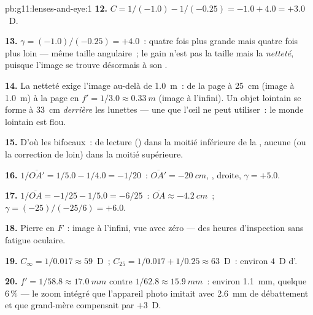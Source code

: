 \begin{solution}{pb:g11:lenses-and-eye:1}
\textbf{12.} $C = 1/(-1.0) - 1/(-0.25) = -1.0 + 4.0 = +3.0$~D.

\textbf{13.} $\gamma = (-1.0)/(-0.25) = +4.0$~: quatre fois plus grande
mais quatre fois plus loin --- même taille angulaire~; le gain n'est
pas la taille mais la \emph{netteté}, puisque l'image se trouve
désormais à son .

\textbf{14.} La netteté exige l'image au-delà de \qty{1.0}{m}~: de la
page à \qty{25}{cm} (image à \qty{1.0}{m}) à la page en
$f' = 1/3.0 \approx \qty{0.33}{m}$ (image à l'infini). Un objet
lointain se forme à \qty{33}{cm} \emph{derrière} les lunettes --- une
 que l'œil ne peut utiliser~: le monde
lointain est flou.

\textbf{15.} D'où les bifocaux~:  de lecture
() dans la moitié inférieure de la
, aucune (ou la correction de loin) dans la
moitié supérieure.

\textbf{16.} $1/\overline{OA'} = 1/5.0 - 1/4.0 = -1/20$~:
$\overline{OA'} = \qty{-20}{cm}$, ,
droite, $\gamma = +5.0$.

\textbf{17.} $1/\overline{OA} = -1/25 - 1/5.0 = -6/25$~:
$\overline{OA} \approx \qty{-4.2}{cm}$~; $\gamma = (-25)/(-25/6) = +6.0$.

\textbf{18.} Pierre en $F$~: image à l'infini, vue avec zéro
 --- des heures d'inspection sans fatigue
oculaire.

\textbf{19.} $C_\infty = 1/0.017 \approx 59$~D~;
$C_{25} = 1/0.017 + 1/0.25 \approx 63$~D~: environ $4$~D
d'.

\textbf{20.} $f' = 1/58.8 \approx \qty{17.0}{mm}$ contre
$1/62.8 \approx \qty{15.9}{mm}$~: environ \qty{1.1}{mm}, quelque
$6\,\%$ --- le zoom intégré que l'appareil photo imitait avec
\qty{2.6}{mm} de débattement et que grand-mère compensait par $+3$~D.
\end{solution}
